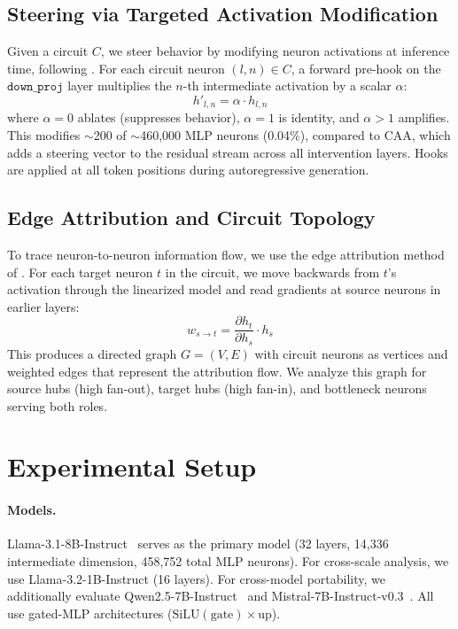 \documentclass[11pt]{article}
\begin{document}
\subsection{Steering via Targeted Activation Modification}
\label{sec:steering}

Given a circuit $C$, we steer behavior by modifying neuron activations at inference time, following \citet{arora2025circuits}.
For each circuit neuron $(l, n) \in C$, a forward pre-hook on the $\texttt{down\_proj}$ layer multiplies the $n$-th intermediate activation by a scalar $\alpha$:
\begin{equation}
    h'_{l,n} = \alpha \cdot h_{l,n}
\end{equation}
where $\alpha = 0$ ablates (suppresses behavior), $\alpha = 1$ is identity, and $\alpha > 1$ amplifies.
This modifies ${\sim}$200 of ${\sim}$460,000 MLP neurons (0.04\%), compared to CAA, which adds a steering vector to the residual stream across all intervention layers.
Hooks are applied at all token positions during autoregressive generation.

\subsection{Edge Attribution and Circuit Topology}
\label{sec:edges}

To trace neuron-to-neuron information flow, we use the edge attribution method of \citet{arora2025circuits}.
For each target neuron $t$ in the circuit, we move backwards from $t$'s activation through the linearized model and read gradients at source neurons in earlier layers:
\begin{equation}
    w_{s \to t} = \frac{\partial h_t}{\partial h_s} \cdot h_s
\end{equation}
This produces a directed graph $G = (V, E)$ with circuit neurons as vertices and weighted edges that represent the attribution flow.
We analyze this graph for source hubs (high fan-out), target hubs (high fan-in), and bottleneck neurons serving both roles.


\section{Experimental Setup}
\label{sec:setup}

\paragraph{Models.}
Llama-3.1-8B-Instruct~\citep{dubey2024llama3} serves as the primary model (32 layers, 14,336 intermediate dimension, 458,752 total MLP neurons).
For cross-scale analysis, we use Llama-3.2-1B-Instruct (16 layers).
For cross-model portability, we additionally evaluate Qwen2.5-7B-Instruct~\citep{yang2024qwen2} and Mistral-7B-Instruct-v0.3~\citep{jiang2023mistral}.
All use gated-MLP architectures ($\text{SiLU}(\text{gate}) \times \text{up}$).
\end{document}
